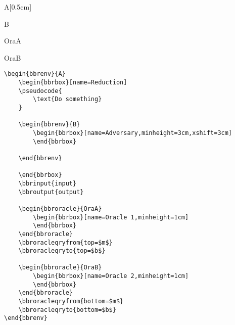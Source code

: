 \documentclass[a4paper]{report}
\begin{document}
\begin{bbrenv}[1cm]{A}[0.5cm]
	\begin{bbrbox}[name=Reduction]

	\begin{bbrenv}{B}
		\begin{bbrbox}[name=Adversary,minheight=3cm,xshift=3cm]
		\end{bbrbox}

	\end{bbrenv}

	\end{bbrbox}

	\begin{bbroracle}{OraA}
		\begin{bbrbox}[name=Oracle 1,minheight=1cm]
		\end{bbrbox}
	\end{bbroracle}

	\begin{bbroracle}{OraB}
		\begin{bbrbox}[name=Oracle 2,minheight=1cm]
		\end{bbrbox}
	\end{bbroracle}
\end{bbrenv}

\begin{lstlisting}
\begin{bbrenv}{A}
	\begin{bbrbox}[name=Reduction]
	\pseudocode{
		\text{Do something} 
	}

	\begin{bbrenv}{B}
		\begin{bbrbox}[name=Adversary,minheight=3cm,xshift=3cm]
		\end{bbrbox}

	\end{bbrenv}

	\end{bbrbox}
	\bbrinput{input}
	\bbroutput{output}

	\begin{bbroracle}{OraA}
		\begin{bbrbox}[name=Oracle 1,minheight=1cm]
		\end{bbrbox}
	\end{bbroracle}
	\bbroracleqryfrom{top=$m$}
	\bbroracleqryto{top=$b$}

	\begin{bbroracle}{OraB}
		\begin{bbrbox}[name=Oracle 2,minheight=1cm]
		\end{bbrbox}
	\end{bbroracle}
	\bbroracleqryfrom{bottom=$m$}
	\bbroracleqryto{bottom=$b$}
\end{bbrenv}
\end{lstlisting}
\end{document}
